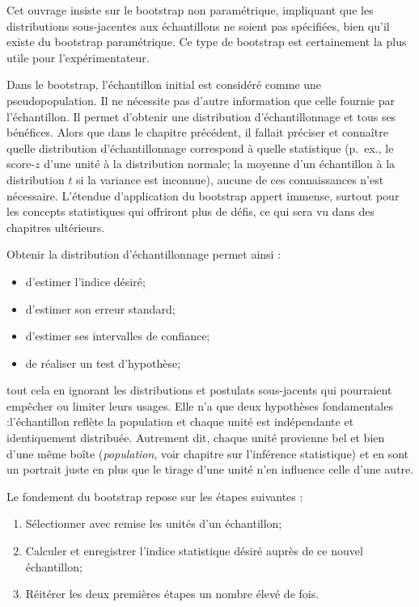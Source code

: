 \documentclass[
]{book}
\begin{document}
Cet ouvrage insiste sur le bootstrap non paramétrique, impliquant que les distributions sous-jacentes aux échantillons ne soient pas spécifiées, bien qu'il existe du bootstrap paramétrique. Ce type de bootstrap est certainement la plus utile pour l'expérimentateur.

Dans le bootstrap, l'échantillon initial est considéré comme une pseudopopulation. Il ne nécessite pas d'autre information que celle fournie par l'échantillon. Il permet d'obtenir une distribution d'échantillonnage et tous ses bénéfices. Alors que dans le chapitre précédent, il fallait préciser et connaître quelle distribution d'échantillonnage correspond à quelle statistique (p.~ex., le score-\(z\) d'une unité à la distribution normale; la moyenne d'un échantillon à la distribution \(t\) si la variance est inconnue), aucune de ces connaissances n'est nécessaire. L'étendue d'application du bootstrap appert immense, surtout pour les concepts statistiques qui offriront plus de défis, ce qui sera vu dans des chapitres ultérieurs.

Obtenir la distribution d'échantillonnage permet ainsi :

\begin{itemize}
\item
  d'estimer l'indice désiré;
\item
  d'estimer son erreur standard;
\item
  d'estimer ses intervalles de confiance;
\item
  de réaliser un test d'hypothèse;
\end{itemize}

tout cela en ignorant les distributions et postulats sous-jacents qui pourraient empêcher ou limiter leurs usages. Elle n'a que deux hypothèses fondamentales :l'échantillon reflète la population et chaque unité est indépendante et identiquement distribuée. Autrement dit, chaque unité provienne bel et bien d'une même boîte (\emph{population}, voir chapitre sur l'inférence statistique) et en sont un portrait juste en plus que le tirage d'une unité n'en influence celle d'une autre.

Le fondement du bootstrap repose sur les étapes suivantes :

\begin{enumerate}
\def\labelenumi{\arabic{enumi}.}
\item
  Sélectionner avec remise les unités d'un échantillon;
\item
  Calculer et enregistrer l'indice statistique désiré auprès de ce nouvel échantillon;
\item
  Réitérer les deux premières étapes un nombre élevé de fois.
\end{enumerate}
\end{document}
